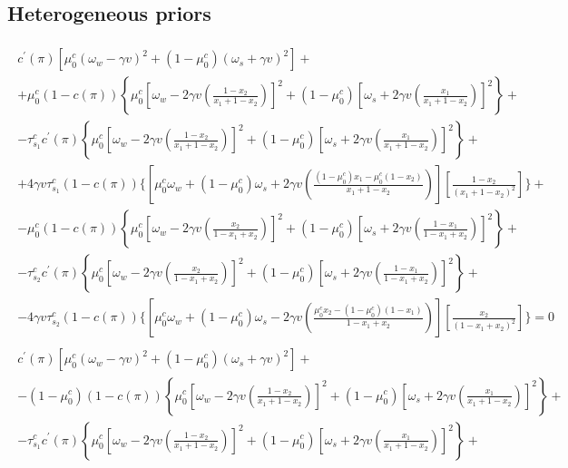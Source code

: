 \documentclass[12pt,a4paper]{article}
\begin{document}
\subsection{Heterogeneous priors}
    \begin{small}
\begin{eqnarray}
\label{focx1gen2}
    \begin{split}
        c^\prime(\pi)\left[\mu_0^c(\omega_w-\gamma v)^2+(1-\mu_0^c)(\omega_s+\gamma v)^2\right]+ \\
        +\mu_0^c(1-c(\pi))\left\{\mu_0^c\left[\omega_w-2\gamma v\left(\frac{1-x_2}{x_1+1-x_2}\right)\right]^2+(1-\mu_0^c)\left[\omega_s+2\gamma v\left(\frac{x_1}{x_1+1-x_2}\right)\right]^2\right\}+ \\
        -\tau_{s_1}^cc^\prime(\pi)\left\{\mu_0^c\left[\omega_w-2\gamma v\left(\frac{1-x_2}{x_1+1-x_2}\right)\right]^2+(1-\mu_0^c)\left[\omega_s+2\gamma v\left(\frac{x_1}{x_1+1-x_2}\right)\right]^2\right\}+ \\
        +4\gamma v\tau_{s_1}^c(1-c(\pi))\Bigg\{\left[\mu_0^c\omega_w+(1-\mu_0^c)\omega_s+2\gamma v\left(\frac{(1-\mu_0^c)x_1-\mu_0^c(1-x_2)}{x_1+1-x_2}\right)\right]\left[\frac{1-x_2}{(x_1+1-x_2)^2}\right]\Bigg\}+\\
        -\mu_0^c(1-c(\pi))\left\{\mu_0^c\left[\omega_w-2\gamma v\left(\frac{x_2}{1-x_1+x_2}\right)\right]^2+(1-\mu_0^c)\left[\omega_s+2\gamma v\left(\frac{1-x_1}{1-x_1+x_2}\right)\right]^2\right\}+\\
        -\tau_{s_2}^cc^\prime(\pi)\left\{\mu_0^c\left[\omega_w-2\gamma v\left(\frac{x_2}{1-x_1+x_2}\right)\right]^2+(1-\mu_0^c)\left[\omega_s+2\gamma v\left(\frac{1-x_1}{1-x_1+x_2}\right)\right]^2\right\}+\\
        -4\gamma v\tau_{s_2}^c(1-c(\pi))\Bigg\{\left[\mu_0^c\omega_w+(1-\mu_0^c)\omega_s-2\gamma v\left(\frac{\mu_0^cx_2-(1-\mu_0^c)(1-x_1)}{1-x_1+x_2}\right)\right]\left[\frac{x_2}{(1-x_1+x_2)^2}\right]\Bigg\}=0
    \end{split} \\
    \label{focx2gen2}
    \begin{split}
        c^\prime(\pi)\left[\mu_0^c(\omega_w-\gamma v)^2+(1-\mu_0^c)(\omega_s+\gamma v)^2\right]+ \\
        -(1-\mu_0^c)(1-c(\pi))\left\{\mu_0^c\left[\omega_w-2\gamma v\left(\frac{1-x_2}{x_1+1-x_2}\right)\right]^2+(1-\mu_0^c)\left[\omega_s+2\gamma v\left(\frac{x_1}{x_1+1-x_2}\right)\right]^2\right\}+ \\
        -\tau_{s_1}^cc^\prime(\pi)\left\{\mu_0^c\left[\omega_w-2\gamma v\left(\frac{1-x_2}{x_1+1-x_2}\right)\right]^2+(1-\mu_0^c)\left[\omega_s+2\gamma v\left(\frac{x_1}{x_1+1-x_2}\right)\right]^2\right\}+ \\

\end{split}
\end{eqnarray}
\end{small}
\end{document}
